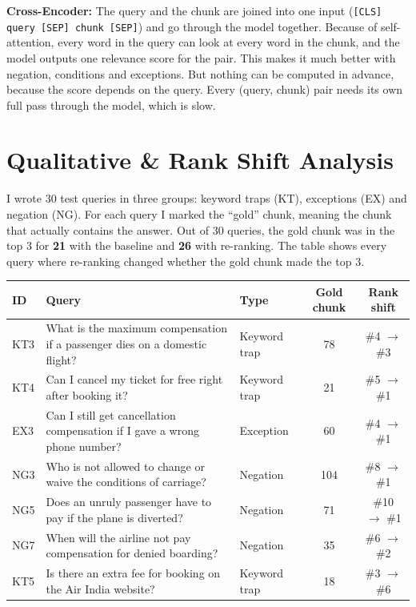\documentclass[11pt,a4paper]{article}
\begin{document}
\textbf{Cross-Encoder:} The query and the chunk are joined into one input
(\texttt{[CLS] query [SEP] chunk [SEP]}) and go through the model together. Because of self-attention, every word in
the query can look at every word in the chunk, and the model outputs one relevance score for the pair. This makes it
much better with negation, conditions and exceptions. But nothing can be computed in advance, because the score
depends on the query. Every (query, chunk) pair needs its own full pass through the model, which is slow.

\section{Qualitative \& Rank Shift Analysis}

I wrote 30 test queries in three groups: keyword traps (KT), exceptions (EX) and negation (NG). For each query I
marked the ``gold'' chunk, meaning the chunk that actually contains the answer. Out of 30 queries, the gold chunk was
in the top 3 for \textbf{21} with the baseline and \textbf{26} with re-ranking. The table shows every query where
re-ranking changed whether the gold chunk made the top 3.

\begin{center}
\begin{tabularx}{\textwidth}{l X l c c}
\toprule
\textbf{ID} & \textbf{Query} & \textbf{Type} & \textbf{Gold chunk} & \textbf{Rank shift} \\
\midrule
KT3 & What is the maximum compensation if a passenger dies on a domestic flight? & Keyword trap & 78  & \#4 $\to$ \#3 \\
KT4 & Can I cancel my ticket for free right after booking it?                   & Keyword trap & 21  & \#5 $\to$ \#1 \\
EX3 & Can I still get cancellation compensation if I gave a wrong phone number? & Exception    & 60  & \#4 $\to$ \#1 \\
NG3 & Who is not allowed to change or waive the conditions of carriage?          & Negation     & 104 & \#8 $\to$ \#1 \\
NG5 & Does an unruly passenger have to pay if the plane is diverted?             & Negation     & 71  & \#10 $\to$ \#1 \\
NG7 & When will the airline not pay compensation for denied boarding?            & Negation     & 35  & \#6 $\to$ \#2 \\
\midrule
KT5 & Is there an extra fee for booking on the Air India website?                & Keyword trap & 18  & \#3 $\to$ \#6 \\
\bottomrule
\end{tabularx}
\end{center}
\end{document}
